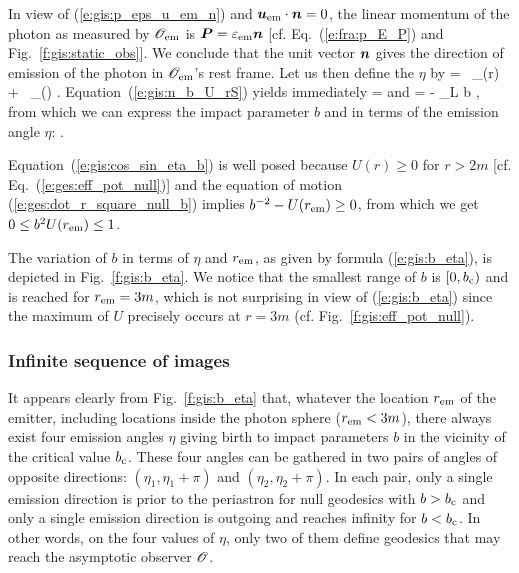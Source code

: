 In view of (\ref{e:gis:p_eps_u_em_n}) and $\bm{u}_{\rm em}\cdot\bm{n} = 0$,
the linear momentum of the photon as measured by $\mathscr{O}_{\rm em}$ is
$\bm{P} = \varepsilon_{\rm em} \bm{n}$ [cf. Eq.~(\ref{e:fra:p_E_P}) and Fig.~\ref{f:gis:static_obs}].
We conclude that the unit vector $\bm{n}$ gives the direction of emission
of the photon in $\mathscr{O}_{\rm em}$'s rest frame. Let us then define the  $\eta$ by
\be
     = \cos\eta\, _{(r)} + \sin\eta \, _{(\ph)} .
\ee
Equation~(\ref{e:gis:n_b_U_rS}) yields immediately
\be \label{e:gis:cos_sin_eta_b}
 \cos\eta = \pm {} \qquad\mbox{and}\qquad
 \sin\eta = - \eps_L b  ,
\ee
from which we can express the impact parameter $b$ and
in terms of the emission angle $\eta$:
\be \label{e:gis:b_eta}
    .
\ee
\begin{remark}
Equation~(\ref{e:gis:cos_sin_eta_b}) is well posed because
$U(r)\geq 0$ for $r>2m$ [cf. Eq.~(\ref{e:ges:eff_pot_null})]
and the equation
of motion (\ref{e:ges:dot_r_square_null_b}) implies $b^{-2} - U(r_{\rm em}) \geq 0$,
from which we get $0 \leq b^2 U(r_{\rm em}) \leq 1$.
\end{remark}

The variation of $b$ in terms of $\eta$ and $r_{\rm em}$, as given by formula (\ref{e:gis:b_eta}),
is depicted in Fig.~\ref{f:gis:b_eta}. We notice that the smallest range of $b$
is $[0, b_{\rm c})$ and is reached for $r_{\rm em} = 3m$, which is not surprising
in view of (\ref{e:gis:b_eta}) since the maximum of $U$ precisely occurs at $r=3m$
(cf. Fig.~\ref{f:gis:eff_pot_null}).

\subsubsection{Infinite sequence of images}

It appears clearly from Fig.~\ref{f:gis:b_eta}
that, whatever the location $r_{\rm em}$ of the emitter, including locations
inside the photon sphere ($r_{\rm em} < 3 m$), there always exist four
emission angles $\eta$ giving birth to impact parameters $b$ in the vicinity
of the critical value $b_{\rm c}$. These four angles can be gathered in two
pairs of angles of opposite directions: $(\eta_1, \eta_1+\pi)$ and
$(\eta_2, \eta_2+\pi)$. In each pair, only a single emission direction is prior to the
periastron for null geodesics with $b > b_{\rm c}$ and only a single emission
direction is outgoing and reaches infinity for $b < b_{\rm c}$. In other words,
on the four values of $\eta$, only two of them define geodesics that may reach
the asymptotic observer $\mathscr{O}$.

